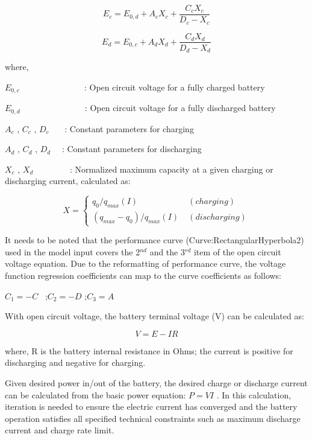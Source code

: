 \begin{equation}
{E_c} = {E_{0,d}} + {A_c}{X_c} + \frac{{{C_c}{X_c}}}{{{D_c} - {X_c}}}
\end{equation}

\begin{equation}
{E_d} = {E_{0,c}} + {A_d}{X_d} + \frac{{{C_d}{X_d}}}{{{D_d} - {X_d}}}
\end{equation}

where,

\({E_{0,c}}\) ~~~~~~~~~~~~~~ : Open circuit voltage for a fully charged battery

\({E_{0,d}}\) ~~~~~~~~~~~~~~ : Open circuit voltage for a fully discharged battery

\({A_c}\) , \({C_c}\) , \({D_c}\) ~~~: Constant parameters for charging

\({A_d}\) , \({C_d}\) , \({D_d}\) ~~: Constant parameters for discharging

\({X_c}\) , \({X_d}\) ~~~~~~~~: Normalized maximum capacity at a given charging or discharging current, calculated as:

\begin{equation}
X = \left\{
    \begin{array}{cl}
      q_0 / q_{max}(I) & \; (charging) \\
      (q_{max}-q_0)/q_{max}(I) & \; (discharging)
    \end{array}
  \right.
\end{equation}

It needs to be noted that the performance curve (Curve:RectangularHyperbola2) used in the model input covers the 2\(^{nd}\) and the 3\(^{rd}\) item of the open circuit voltage equation. Due to the reformatting of performance curve, the voltage function regression coefficients can map to the curve coefficients as follows:

\({C_1} = - C\) ~;\({C_2} = - D\) ;\({C_3} = A\)

With open circuit voltage, the battery terminal voltage (V) can be calculated as:

\begin{equation}
V = E - IR
\end{equation}

where, R is the battery internal resistance in Ohms; the current is positive for discharging and negative for charging.

Given desired power in/out of the battery, the desired charge or discharge current can be calculated from the basic power equation: \(P = VI\) . In this calculation, iteration is needed to ensure the electric current has converged and the battery operation satisfies all specified technical constraints such as maximum discharge current and charge rate limit.

